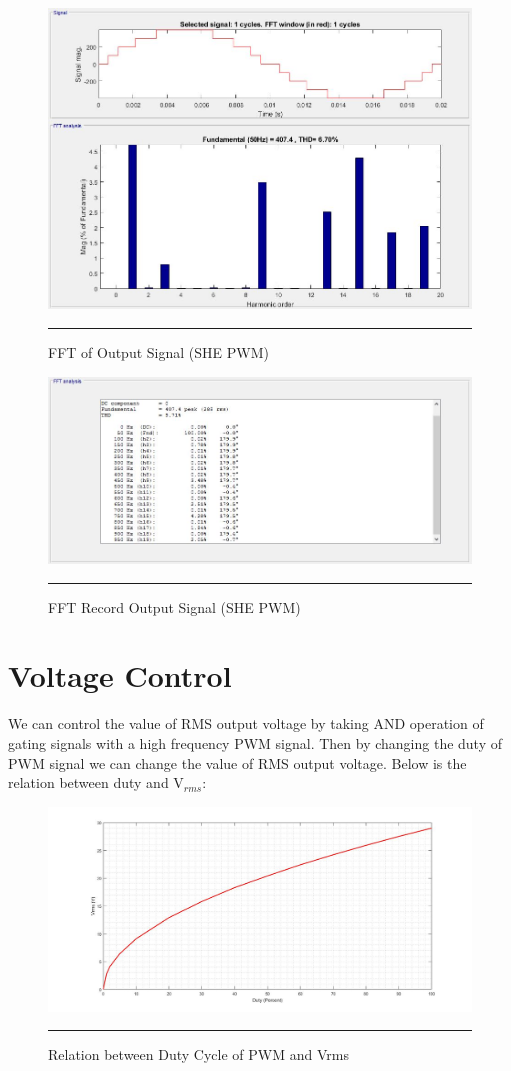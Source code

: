 \begin{figure}[htbp]
	\centering
	\includegraphics[width = 6in]{./Figures/Photos/Simulink/SHE_FFT.jpg}
	\rule{35em}{1pt}
	\caption{FFT of Output Signal (SHE PWM)}
\end{figure}
\begin{figure}[htbp]
	\centering
	\includegraphics[width = 6in]{./Figures/Photos/Simulink/SHE_FFT_table.jpg}
	\rule{35em}{1pt}
	\caption{FFT Record Output Signal (SHE PWM)}
\end{figure}
\newpage
\section{Voltage Control}
We can control the value of RMS output voltage by taking AND operation of gating signals with a high frequency PWM signal. Then by changing the duty of PWM signal we can change the value of RMS output voltage.
Below is the relation between duty and V$_{rms}$:
 \begin{figure}[htbp]
 	\centering
 	\includegraphics[width = 6in]{./Figures/Photos/Simulink/d_vrms.jpg}
 	\rule{35em}{1pt}
 	\caption{Relation between Duty Cycle of PWM and Vrms}
 \end{figure}
